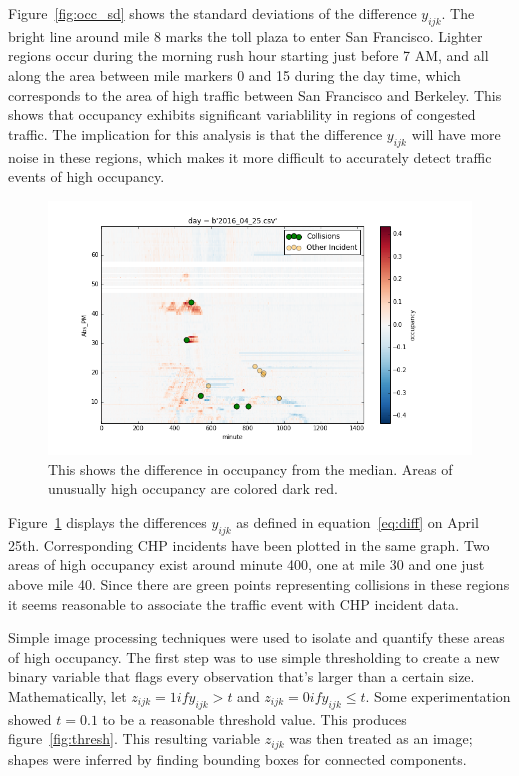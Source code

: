 \documentclass[12pt]{article}
\begin{document}
Figure~\ref{fig:occ_sd} shows the standard deviations of the difference
$y_{ijk}$. The bright line around mile 8 marks the toll plaza to enter
San Francisco. Lighter regions occur during the morning rush hour starting just
before 7 AM, and all along the area between mile markers 0 and 15 during
the day time, which corresponds to the area of high traffic between San
Francisco and Berkeley. This shows that occupancy exhibits significant
variablility in regions of congested traffic. The implication for this
analysis is that the difference $y_{ijk}$ will have more noise in these
regions, which makes it more difficult to accurately detect traffic events
of high occupancy.

\begin{figure}
    \label{fig:diffs}
    \centering
    \includegraphics[scale=0.5]{../diffs.png}
    \caption{This shows the difference in occupancy from the median. Areas
    of unusually high occupancy are colored dark red.
    }
\end{figure}

Figure~\ref{fig:diffs} displays the differences $y_{ijk}$ as defined in
equation~\ref{eq:diff} on April 25th.  Corresponding CHP incidents have
been plotted in the same graph.  Two areas of high occupancy exist around
minute 400, one at mile 30 and one just above mile 40. Since there are
green points representing collisions in these regions it seems reasonable to
associate the traffic event with CHP incident data.

Simple image processing techniques were used to isolate and quantify these areas of
high occupancy. The first step was to use simple thresholding to create a
new binary variable that flags every observation that's larger than a
certain size.
Mathematically, let $z_{ijk} = 1 if y_{ijk} > t$ and $z_{ijk} = 0 if y_{ijk}
\leq t$. Some experimentation showed $t = 0.1$ to be a reasonable threshold
value. This produces figure~\ref{fig:thresh}. This resulting variable
$z_{ijk}$ was
then treated as an image; shapes were inferred by finding bounding boxes
for connected components.
\end{document}
